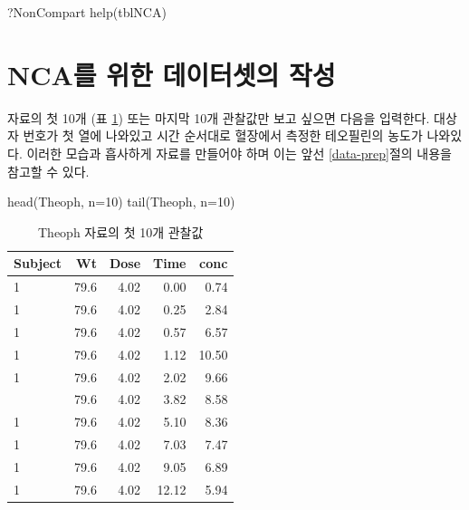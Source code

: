 \documentclass[
  11pt,
  krantz2, a4paper, twoside]{krantz}
\newenvironment{Shaded}{\begin{snugshade}}{\end{snugshade}}
\newcommand{\AttributeTok}[1]{\textcolor[rgb]{0.77,0.63,0.00}{#1}}
\newcommand{\DecValTok}[1]{\textcolor[rgb]{0.00,0.00,0.81}{#1}}
\newcommand{\FunctionTok}[1]{\textcolor[rgb]{0.00,0.00,0.00}{#1}}
\newcommand{\NormalTok}[1]{#1}
\theoremstyle{definition}
\theoremstyle{definition}
\theoremstyle{definition}
\theoremstyle{definition}
\theoremstyle{remark}
\begin{document}
\begin{Shaded}
\begin{Highlighting}[]
\NormalTok{?NonCompart}
\FunctionTok{help}\NormalTok{(tblNCA)}
\end{Highlighting}
\end{Shaded}

\hypertarget{ncauxb97c-uxc704uxd55c-uxb370uxc774uxd130uxc14buxc758-uxc791uxc131}{%
\section{NCA를 위한 데이터셋의 작성}\label{ncauxb97c-uxc704uxd55c-uxb370uxc774uxd130uxc14buxc758-uxc791uxc131}}

자료의 첫 10개 (표 \ref{tab:head}) 또는 마지막 10개 관찰값만 보고 싶으면 다음을 입력한다.
대상자 번호가 첫 열에 나와있고 시간 순서대로 혈장에서 측정한 테오필린의 농도가 나와있다.
이러한 모습과 흡사하게 자료를 만들어야 하며 이는 앞선 \ref{data-prep}절의 내용을 참고할 수 있다.

\begin{Shaded}
\begin{Highlighting}[]
\FunctionTok{head}\NormalTok{(Theoph, }\AttributeTok{n=}\DecValTok{10}\NormalTok{)}
\FunctionTok{tail}\NormalTok{(Theoph, }\AttributeTok{n=}\DecValTok{10}\NormalTok{)}
\end{Highlighting}
\end{Shaded}

\begin{table}

\caption{\label{tab:head}Theoph 자료의 첫 10개 관찰값}
\centering
\begin{tabular}[t]{lrrrr}
\toprule
Subject & Wt & Dose & Time & conc\\
\midrule
1 & 79.6 & 4.02 & 0.00 & 0.74\\
1 & 79.6 & 4.02 & 0.25 & 2.84\\
1 & 79.6 & 4.02 & 0.57 & 6.57\\
1 & 79.6 & 4.02 & 1.12 & 10.50\\
1 & 79.6 & 4.02 & 2.02 & 9.66\\
\addlinespace
1 & 79.6 & 4.02 & 3.82 & 8.58\\
1 & 79.6 & 4.02 & 5.10 & 8.36\\
1 & 79.6 & 4.02 & 7.03 & 7.47\\
1 & 79.6 & 4.02 & 9.05 & 6.89\\
1 & 79.6 & 4.02 & 12.12 & 5.94\\
\bottomrule
\end{tabular}
\end{table}
\end{document}

